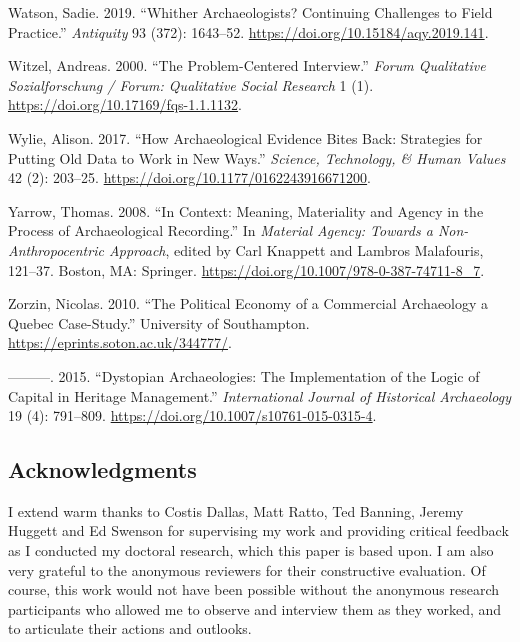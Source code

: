 \documentclass[
]{article}
\newlength{\cslhangindent}
\newenvironment{CSLReferences}[2] %
 {\begin{list}{}{%
  \setlength{\itemindent}{0pt}
  \setlength{\leftmargin}{0pt}
  \setlength{\parsep}{0pt}
  \ifodd #1
   \setlength{\leftmargin}{\cslhangindent}
   \setlength{\itemindent}{-1\cslhangindent}
  \fi
  \setlength{\itemsep}{#2\baselineskip}}}
 {\end{list}}
\begin{document}
\begin{CSLReferences}{1}{0}
Watson, Sadie. 2019. {``Whither Archaeologists? {Continuing} Challenges
to Field Practice.''} \emph{Antiquity} 93 (372): 1643--52.
\url{https://doi.org/10.15184/aqy.2019.141}.

Witzel, Andreas. 2000. {``The Problem-Centered Interview.''} \emph{Forum
Qualitative Sozialforschung / Forum: Qualitative Social Research} 1 (1).
\url{https://doi.org/10.17169/fqs-1.1.1132}.

Wylie, Alison. 2017. {``How {Archaeological Evidence Bites Back}:
{Strategies} for {Putting Old Data} to {Work} in {New Ways}.''}
\emph{Science, Technology, \& Human Values} 42 (2): 203--25.
\url{https://doi.org/10.1177/0162243916671200}.

Yarrow, Thomas. 2008. {``In {Context}: {Meaning}, {Materiality} and
{Agency} in the {Process} of {Archaeological Recording}.''} In
\emph{Material {Agency}: {Towards} a {Non-Anthropocentric Approach}},
edited by Carl Knappett and Lambros Malafouris, 121--37. Boston, MA:
Springer. \url{https://doi.org/10.1007/978-0-387-74711-8_7}.

Zorzin, Nicolas. 2010. {``The Political Economy of a Commercial
Archaeology a {Quebec} Case-Study.''} University of Southampton.
\url{https://eprints.soton.ac.uk/344777/}.

---------. 2015. {``Dystopian {Archaeologies}: {The Implementation} of
the {Logic} of {Capital} in {Heritage Management}.''}
\emph{International Journal of Historical Archaeology} 19 (4): 791--809.
\url{https://doi.org/10.1007/s10761-015-0315-4}.

\end{CSLReferences}

\newpage

\subsection{Acknowledgments}\label{acknowledgments}

I extend warm thanks to Costis Dallas, Matt Ratto, Ted Banning, Jeremy
Huggett and Ed Swenson for supervising my work and providing critical
feedback as I conducted my doctoral research, which this paper is based
upon. I am also very grateful to the anonymous reviewers for their
constructive evaluation. Of course, this work would not have been
possible without the anonymous research participants who allowed me to
observe and interview them as they worked, and to articulate their
actions and outlooks.
\end{document}
